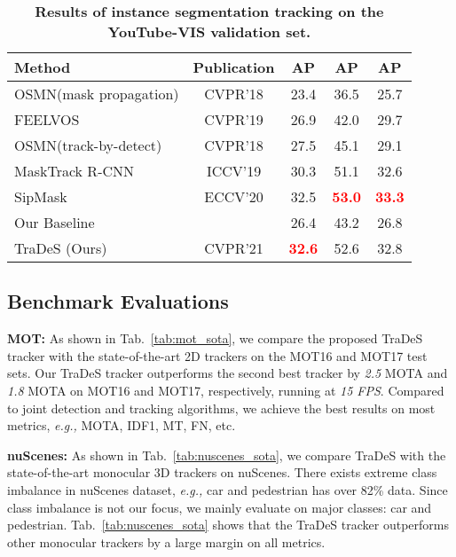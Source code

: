 \documentclass[final]{cvpr}
\newcommand{\myparagraph}[1]{{\vspace{0.5em} \noindent \bf #1}}
\begin{document}
\begin{table}[h]
	\vspace{-2mm}
	\begin{center}	
		\small
		\setlength{\tabcolsep}{3pt}
		\begin{tabular}{l|c|ccc}
			\shline
			\rowcolor{mygray}
			Method&Publication&AP&AP&AP\\ 
			\hline \hline
			OSMN(mask propagation)\cite{Yang_2018_CVPR}&CVPR'18&23.4&36.5&25.7\\
			FEELVOS\cite{voigtlaender2019feelvos}&CVPR'19& 26.9&42.0&29.7\\
			OSMN(track-by-detect)\cite{Yang_2018_CVPR}&CVPR'18&27.5&45.1&29.1\\
			MaskTrack R-CNN\cite{yang2019video}&ICCV'19&30.3&51.1&32.6\\
			SipMask\cite{cao2020sipmask}&ECCV'20&32.5&\textcolor{red}{\bf53.0}&\textcolor{red}{\bf33.3}\\
			\hline
			Our Baseline&&26.4&43.2&26.8\\
			TraDeS (Ours)&CVPR'21&\textcolor{red}{\bf32.6}&52.6&32.8\\
			\hline
		\end{tabular}
	\end{center}
	\vspace{-2mm}
	\caption{\textbf{Results of instance segmentation tracking on the YouTube-VIS validation set.}}
	\label{tab:youtube_vis_sota}
	\vspace{-3mm}
\end{table}

\subsection{Benchmark Evaluations}
\label{subsec:sota}
\vspace{-2mm}
\myparagraph{MOT:} As shown in Tab.~\ref{tab:mot_sota}, we compare the proposed TraDeS tracker with the state-of-the-art 2D trackers on the MOT16 and MOT17 test sets. Our TraDeS tracker outperforms the second best tracker by \emph{2.5} MOTA and \emph{1.8} MOTA on MOT16 and MOT17, respectively, running at \emph{15 FPS}. Compared to joint detection and tracking algorithms, we achieve the best results on most metrics, \emph{e.g.,} MOTA, IDF1, MT, FN, etc. 

\myparagraph{nuScenes:} As shown in Tab.~\ref{tab:nuscenes_sota}, we compare TraDeS with the state-of-the-art monocular 3D trackers on nuScenes. There exists extreme class imbalance in nuScenes dataset, \emph{e.g.,} car and pedestrian has over 82\% data. Since class imbalance is not our focus, we mainly evaluate on major classes: car and pedestrian. Tab.~\ref{tab:nuscenes_sota} shows that the TraDeS tracker outperforms other monocular trackers by a large margin on all metrics.
\end{document}
